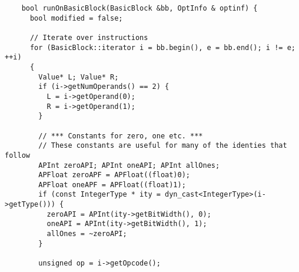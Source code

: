 \documentclass[12pt]{article}
\begin{document}
\begin{verbatim}
    bool runOnBasicBlock(BasicBlock &bb, OptInfo & optinf) {
      bool modified = false;

      // Iterate over instructions
      for (BasicBlock::iterator i = bb.begin(), e = bb.end(); i != e; ++i)
      {
        Value* L; Value* R;
        if (i->getNumOperands() == 2) {
          L = i->getOperand(0);
          R = i->getOperand(1);
        }

        // *** Constants for zero, one etc. ***
        // These constants are useful for many of the identies that follow
        APInt zeroAPI; APInt oneAPI; APInt allOnes;
        APFloat zeroAPF = APFloat((float)0);
        APFloat oneAPF = APFloat((float)1);
        if (const IntegerType * ity = dyn_cast<IntegerType>(i->getType())) {
          zeroAPI = APInt(ity->getBitWidth(), 0);
          oneAPI = APInt(ity->getBitWidth(), 1);
          allOnes = ~zeroAPI;
        }

        unsigned op = i->getOpcode();


\end{verbatim}
\end{document}
